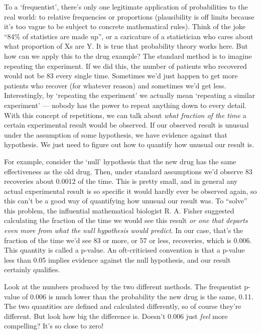 \documentclass[a4paper, 12pt]{article}
\begin{document}
To a `frequentist', there's only one legitimate application of probabilities to
the real world: to relative frequencies or proportions
(plausibility is off
limits because it's too vague to be subject to concrete mathematical rules).
Think of the joke
``84\% of statistics are made up'', or a caricature of a statistician who cares
about what proportion of Xs are Y. It is true that probability theory works
here. But how can we apply this to the drug example?
The standard method is to imagine repeating the experiment.
If we did this, the number of patients who recovered would
not be 83 every single time. Sometimes we'd just happen to get more patients
who recover (for whatever reason) and sometimes we'd get less. Interestingly,
by `repeating the experiment' we actually mean `repeating a similar experiment'
--- nobody has the power to repeat anything down to every detail.
With this concept of repetitions, we can talk about {\em what fraction of the
time} a certain experimental result would be observed. If our observed result
is unusual under the assumption of some hypothesis, we have evidence against
that hypothesis. We just need to figure out how to quantify how unusual our
result is.

For example, consider the `null' hypothesis that the new drug
has the same effectiveness as the old drug. Then, under standard assumptions we'd
observe 83 recoveries about 0.0012 of the time. This is pretty small, and in
general any actual experimental result is so specific it would hardly
ever be observed again, so this can't be a good way of quantifying how unusual
our result was. To ``solve'' this problem, the influential mathematical
biologist R. A. Fisher suggested calculating the fraction of the time we would
see this result {\em or one that departs even more from what the null
hypothesis would predict}. In our case, that's the fraction of the time we'd
see 83 or more, or 57 or less, recoveries, which is 0.006.
This quantity is called a p-value.
An oft-criticised convention is that a p-value less than 0.05 implies evidence
against the null hypothesis, and our result certainly qualifies.

Look at the numbers produced by the two different methods. The frequentist p-value of 0.006 is much lower than the probability the new drug is the same, 0.11.
The two quantities are defined and calculated differently, so of course they're
different. But look how big the difference is. Doesn't 0.006 just {\em feel}
more compelling? It's so close to zero!
\end{document}
